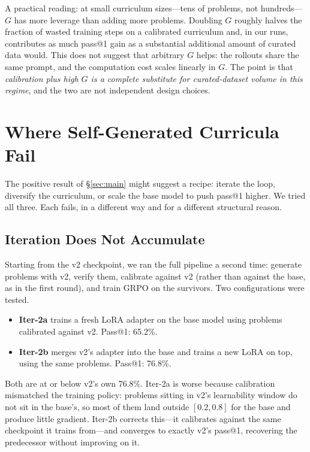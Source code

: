 \documentclass[11pt,a4paper]{article}
\begin{document}
A practical reading: at small curriculum sizes---tens of problems, not hundreds---$G$ has more leverage than adding more problems.
Doubling $G$ roughly halves the fraction of wasted training steps on a calibrated curriculum and, in our runs, contributes as much pass@1 gain as a substantial additional amount of curated data would.
This does not suggest that arbitrary $G$ helps: the rollouts share the same prompt, and the computation cost scales linearly in $G$.
The point is that \emph{calibration plus high $G$ is a complete substitute for curated-dataset volume in this regime}, and the two are not independent design choices.

\section{Where Self-Generated Curricula Fail}
\label{sec:limits}

The positive result of \S\ref{sec:main} might suggest a recipe: iterate the loop, diversify the curriculum, or scale the base model to push pass@1 higher.
We tried all three.
Each fails, in a different way and for a different structural reason.

\subsection{Iteration Does Not Accumulate}
\label{sec:limits-iter}

Starting from the v2 checkpoint, we ran the full pipeline a second time: generate problems with v2, verify them, calibrate against v2 (rather than against the base, as in the first round), and train GRPO on the survivors.
Two configurations were tested.

\begin{itemize}
    \item \textbf{Iter-2a} trains a fresh LoRA adapter on the base model using problems calibrated against v2. Pass@1: 65.2\%.
    \item \textbf{Iter-2b} merges v2's adapter into the base and trains a new LoRA on top, using the same problems. Pass@1: 76.8\%.
\end{itemize}

Both are at or below v2's own 76.8\%.
Iter-2a is worse because calibration mismatched the training policy: problems sitting in v2's learnability window do not sit in the base's, so most of them land outside $[0.2, 0.8]$ for the base and produce little gradient.
Iter-2b corrects this---it calibrates against the same checkpoint it trains from---and converges to exactly v2's pass@1, recovering the predecessor without improving on it.
\end{document}
